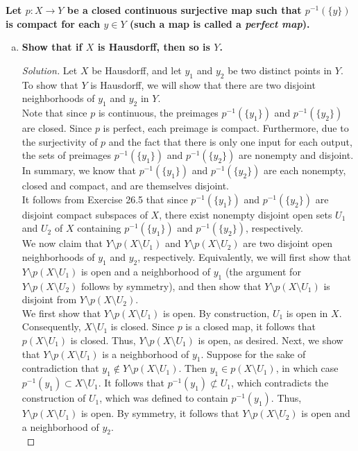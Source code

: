 \documentclass[11pt]{article}
\newenvironment{solution}
  {\renewcommand\qedsymbol{$\blacksquare$}\begin{proof}[Solution]}
  {\end{proof}}
\begin{document}
\textbf{Let $p\colon X \rightarrow Y$ be a closed continuous surjective map such that $p^{-1}(\{ y \})$ is compact for each $y \in Y$ (such a map is called a \textit{perfect map}).}
\begin{enumerate}[a)]
    \item \textbf{Show that if $X$ is Hausdorff, then so is $Y$.}
    
    \begin{solution}
        Let $X$ be Hausdorff, and let $y_1$ and $y_2$ be two distinct points in $Y$. To show that $Y$ is Hausdorff, we will show that there are two disjoint neighborhoods of $y_1$ and $y_2$ in $Y$. \\
        
        Note that since $p$ is continuous, the preimages $p^{-1}(\{ y_1 \} )$ and $p^{-1}(\{ y_2 \} )$ are closed. Since $p$ is perfect, each preimage is compact. 
        Furthermore, due to the surjectivity of $p$ and the fact that there is only one input for each output, the sets of preimages $p^{-1}(\{ y_1 \} )$ and $p^{-1}(\{ y_2 \} )$ are nonempty and disjoint. 
        In summary, we know that  $p^{-1}(\{ y_1 \} )$ and $p^{-1}(\{ y_2 \} )$ are each nonempty, closed and compact, and are themselves disjoint. \\

        It follows from Exercise 26.5 that since  $p^{-1}(\{ y_1 \} )$ and $p^{-1}(\{ y_2 \} )$ are disjoint compact subspaces of $X$, there exist nonempty disjoint open sets $U_1$ and $U_2$ of $X$ containing  $p^{-1}(\{ y_1 \} )$ and $p^{-1}(\{ y_2 \} )$, respectively. \\

        We now claim that $Y \setminus p(X \setminus U_1)$ and $Y \setminus p(X \setminus U_2)$ are two disjoint open neighborhoods of $y_1$ and $y_2$, respectively. Equivalently, we will first show that $Y \setminus p(X \setminus U_1)$ is open and a neighborhood of $y_1$ (the argument
        for $Y \setminus p(X \setminus U_2)$ follows by symmetry), and then show that $Y \setminus p(X \setminus U_1)$ is disjoint from $Y \setminus p(X \setminus U_2)$. \\

        We first show that $Y \setminus p(X \setminus U_1)$ is open. By construction, $U_1$ is open in $X$. Consequently, $X \setminus U_1$ is closed. Since $p$ is a closed map, it follows that $p(X \setminus U_1)$ is closed. Thus, $Y \setminus p(X \setminus U_1)$ is open, as desired. Next, we show
        that $Y \setminus p(X \setminus U_1)$ is a neighborhood of $y_1$. Suppose for the sake of contradiction that $y_1 \notin Y \setminus p(X \setminus U_1)$. Then $y_1 \in p(X \setminus U_1)$, in which case $p^{-1}(y_1) \subset X \setminus U_1$. It follows that
        $p^{-1}(y_1) \not\subset U_1$, which contradicts the construction of $U_1$, which was defined to contain $p^{-1}(y_1)$. Thus, $Y \setminus p(X \setminus U_1)$ is open. By symmetry, it follows that $Y \setminus p(X \setminus U_2 )$ is open and a neighborhood of $y_2$. \\
        

\end{solution}
\end{enumerate}
\end{document}
